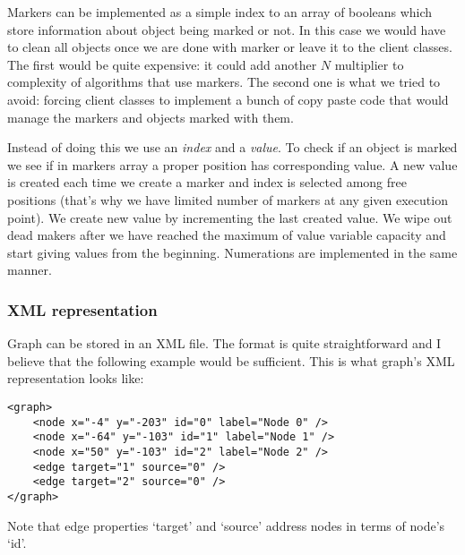 \documentclass[11pt,twoside,a4paper]{article}
\begin{document}
Markers can be implemented as a simple index to an array of booleans which store information about object being marked or not. In this case we would have to clean all objects once we are done with marker or leave it to the client classes. The first would be quite expensive: it could add another $N$ multiplier to complexity of algorithms that use markers. The second one is what we tried to avoid: forcing client classes to implement a bunch of copy paste code that would manage the markers and objects marked with them.

Instead of doing this we use an \emph{index} and a \emph{value}. To check if an object is marked we see if in markers array a proper position has corresponding value. A new value is created each time we create a marker and index is selected among free positions (that's why we have limited number of markers at any given execution point). We create new value by incrementing the last created value. We wipe out dead makers after we have reached the maximum of value variable capacity and start giving values from the beginning. Numerations are implemented in the same manner.

\subsubsection{XML representation}
Graph can be stored in an XML file. The format is quite straightforward and I believe that the following example would be sufficient. This is what graph's XML representation looks like:
\begin{lstlisting}
<graph>
    <node x="-4" y="-203" id="0" label="Node 0" />
    <node x="-64" y="-103" id="1" label="Node 1" />
    <node x="50" y="-103" id="2" label="Node 2" />
    <edge target="1" source="0" />
    <edge target="2" source="0" />
</graph>
\end{lstlisting}
Note that edge properties `target' and `source' address nodes in terms of node's `id'.
\end{document}
